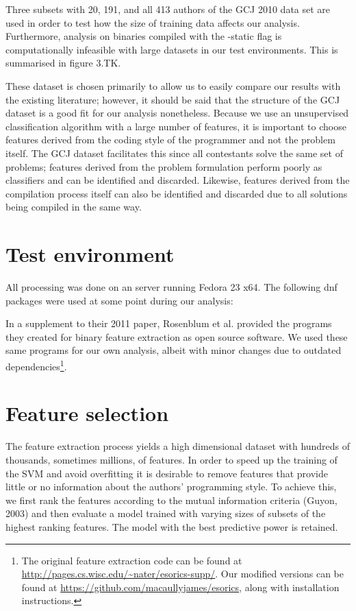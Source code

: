 \documentclass[a4paper,11pt]{kth-mag}
\begin{document}
Three subsets with 20, 191, and all 413 authors of the GCJ 2010 data set are
used in order to test how the size of training data affects our analysis.
Furthermore, analysis on binaries compiled with the -static flag is
computationally infeasible with large datasets in our test environments. This
is summarised in figure 3.TK.

These dataset is chosen primarily to allow us to easily compare our results
with the existing literature; however, it should be said that the structure of
the GCJ dataset is a good fit for our analysis nonetheless. Because we use an
unsupervised classification algorithm with a large number of features, it is
important to choose features derived from the coding style of the programmer
and not the problem itself. The GCJ dataset facilitates this since all
contestants solve the same set of problems; features derived from the problem
formulation perform poorly as classifiers and can be identified and discarded.
Likewise, features derived from the compilation process itself can also be
identified and discarded due to all solutions being compiled in the same way.

\section{Test environment}
All processing was done on an server running Fedora 23 x64. The following dnf
packages were used at some point during our analysis:

In a supplement to their 2011 paper, Rosenblum et al. provided the programs
they created for binary feature extraction as open source software. We used
these same programs for our own analysis, albeit with minor changes due to
outdated dependencies\footnote{
    The original feature extraction code can be found at
    \url{http://pages.cs.wisc.edu/~nater/esorics-supp/}. Our modified versions can be
    found at \url{https://github.com/macaullyjames/esorics}, along with installation
    instructions.
}.

\section{Feature selection}
The feature extraction process yields a high dimensional dataset with hundreds
of thousands, sometimes millions, of features. In order to speed up the
training of the SVM and avoid overfitting it is desirable to remove features
that provide little or no information about the authors’ programming style. To
achieve this, we first rank the features according to the mutual information
criteria (Guyon, 2003) and then evaluate a model trained with varying sizes of
subsets of the highest ranking features. The model with the best predictive
power is retained.
\end{document}
